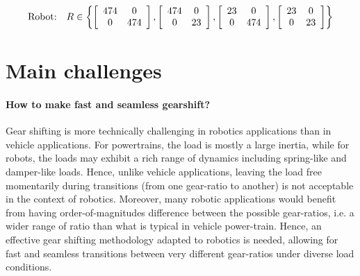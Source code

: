 %
\begin{align}
	\text{Robot:} \quad R \in 
	\left \{
	\left[
	\begin{array}{c c}
	474 & 0 \\ 0 & 474
	\end{array} 
	\right]
	,
	\left[
	\begin{array}{c c}
	474 & 0 \\ 0 & 23
	\end{array} 
	\right]
	,
	\left[
	\begin{array}{c c}
	23 & 0 \\ 0 & 474
	\end{array} 
	\right]
	,
	\left[
	\begin{array}{c c}
	23 & 0 \\ 0 & 23
	\end{array} 
	\right]
	\right \}
 \label{eq:rangestypicalrobot}
\end{align}



\section{Main challenges}
\label{sec:MainChallenges}

\paragraph{How to make fast and seamless gearshift?}
Gear shifting is more technically challenging in robotics applications than in vehicle applications. For powertrains, the load is mostly a large inertia, while for robots, the loads may exhibit a rich range of dynamics including spring-like and damper-like loads. Hence, unlike vehicle applications, leaving the load free momentarily during transitions (from one gear-ratio to another) is not acceptable in the context of robotics. Moreover, many robotic applications would benefit from having order-of-magnitudes difference between the possible gear-ratios, i.e. a wider range of ratio than what is typical in vehicle power-train. Hence, an effective gear shifting methodology adapted to robotics is needed, allowing for fast and seamless transitions between very different gear-ratios under diverse load conditions.

